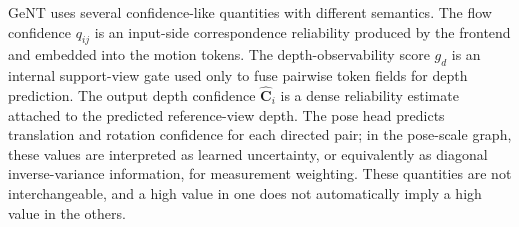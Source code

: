 GeNT uses several confidence-like quantities with different semantics.
The flow confidence $q_{ij}$ is an input-side correspondence reliability produced by the frontend and embedded into the motion tokens.
The depth-observability score $g_d$ is an internal support-view gate used only to fuse pairwise token fields for depth prediction.
The output depth confidence $\hat{\bm{C}}_i$ is a dense reliability estimate attached to the predicted reference-view depth.
The pose head predicts translation and rotation confidence for each directed pair; in the pose-scale graph, these values are interpreted as learned uncertainty, or equivalently as diagonal inverse-variance information, for measurement weighting.
These quantities are not interchangeable, and a high value in one does not automatically imply a high value in the others.

